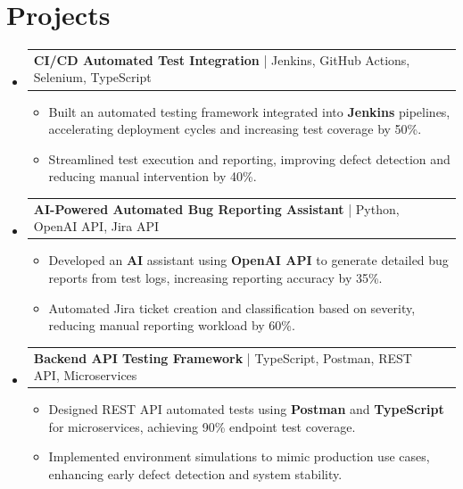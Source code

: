 \documentclass[letterpaper,11pt]{article}
\makeatletter
\newcommand{\resumeItem}[1]{
  \item\footnotesize{
    {#1 \vspace{-2pt}}
  }
}
\newcommand{\resumeProjectHeading}[2]{
    \item
    \begin{tabular*}{1.001\textwidth}{l@{\extracolsep{\fill}}r}
      \small#1 & \textbf{\small #2}\\
    \end{tabular*}\vspace{-7pt}
}
\newcommand{\resumeSubHeadingListStart}{\begin{itemize}[leftmargin=0pt, label={}]}
\newcommand{\resumeSubHeadingListEnd}{\end{itemize}}
\newcommand{\resumeItemListStart}{\begin{itemize}[leftmargin=*]}
\newcommand{\resumeItemListEnd}{\end{itemize}\vspace{-5pt}}
\makeatother
\begin{document}
\section{Projects}
    \vspace{-5pt}
    \resumeSubHeadingListStart
          \resumeProjectHeading
              {\textbf{CI/CD Automated Test Integration} | Jenkins, GitHub Actions, Selenium, TypeScript}{}
        \resumeItemListStart
            \resumeItem{Built an automated testing framework integrated into \textbf{Jenkins} pipelines, accelerating deployment cycles and increasing test coverage by 50\%.}
            \resumeItem{Streamlined test execution and reporting, improving defect detection and reducing manual intervention by 40\%.}
        \resumeItemListEnd
        \vspace{-12pt}
    
    \resumeProjectHeading
        {\textbf{AI-Powered Automated Bug Reporting Assistant} | Python, OpenAI API, Jira API}{}
        \resumeItemListStart
            \resumeItem{Developed an \textbf{AI} assistant using \textbf{OpenAI API} to generate detailed bug reports from test logs, increasing reporting accuracy by 35\%.}
            \resumeItem{Automated Jira ticket creation and classification based on severity, reducing manual reporting workload by 60\%.}
        \resumeItemListEnd
          \vspace{-12pt}
      \resumeProjectHeading
          {\textbf{Backend API Testing Framework} | TypeScript, Postman, REST API, Microservices}{}
          \resumeItemListStart
              \resumeItem{Designed REST API automated tests using \textbf{Postman} and \textbf{TypeScript} for microservices, achieving 90\% endpoint test coverage.}
              \resumeItem{Implemented environment simulations to mimic production use cases, enhancing early defect detection and system stability.}
          \resumeItemListEnd 
    \resumeSubHeadingListEnd
\end{document}
